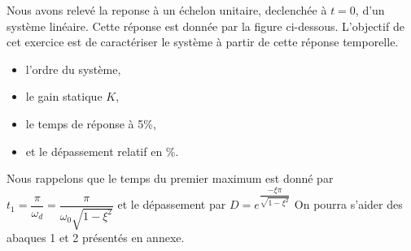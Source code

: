 Nous avons relevé la reponse à un échelon unitaire, 
declenchée à $t=0$, d'un système linéaire.
Cette réponse est donnée par la figure ci-dessous.
L'objectif de cet exercice est de caractériser le système 
à partir de cette réponse temporelle.
\begin{center}
    
\end{center}
\begin{itemize}
    \item l'ordre du système,
    \item le gain statique $K$,
    \item le temps de réponse à 5\%,
    \item et le dépassement relatif en \%.
\end{itemize}
Nous rappelons que le temps du premier maximum est 
donné par $t_1=\dfrac{\pi}{\omega_d}=\dfrac{\pi}{\omega_0\sqrt{1-\xi^2}}$
et le dépassement par $D=e^{\dfrac{-\xi\pi}{\sqrt{1-\xi^2}}}$
On pourra s'aider des abaques 1 et 2 présentés en annexe.

